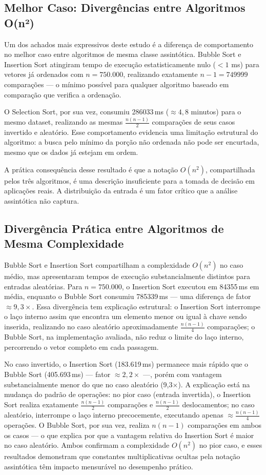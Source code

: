 \documentclass[12pt]{article}
\newcommand{\num}[1]{#1}
\begin{document}
\subsection{Melhor Caso: Divergências entre Algoritmos O(n²)}

Um dos achados mais expressivos deste estudo é a diferença de
comportamento no melhor caso entre algoritmos de mesma classe
assintótica. Bubble Sort e Insertion Sort atingiram tempo de
execução estatisticamente nulo ($< 1$ ms) para vetores já
ordenados com $n = 750.000$, realizando exatamente $n - 1 =
\num{749999}$ comparações — o mínimo possível para qualquer
algoritmo baseado em comparação que verifica a ordenação.

O Selection Sort, por sua vez, consumiu 286033\,ms
($\approx 4,8$ minutos) para o mesmo dataset, realizando as mesmas
$\frac{n(n-1)}{2}$ comparações de seus casos invertido e
aleatório. Esse comportamento evidencia uma limitação estrutural
do algoritmo: a busca pelo mínimo da porção não ordenada não
pode ser encurtada, mesmo que os dados já estejam em ordem.

A prática consequência desse resultado é que a notação $O(n^2)$,
compartilhada pelos três algoritmos, é uma descrição insuficiente
para a tomada de decisão em aplicações reais. A distribuição da
entrada é um fator crítico que a análise assintótica não captura.

\subsection{Divergência Prática entre Algoritmos de Mesma Complexidade}

Bubble Sort e Insertion Sort compartilham a complexidade
$O(n^2)$ no caso médio, mas apresentaram tempos de execução
substancialmente distintos para entradas aleatórias.
Para $n = 750.000$, o Insertion Sort executou em
84355\,ms em média, enquanto o Bubble Sort
consumiu 785339\,ms — uma diferença de fator
$\approx 9{,}3\times$. Essa divergência tem explicação estrutural:
o Insertion Sort interrompe o laço interno assim que encontra
um elemento menor ou igual à chave sendo inserida, realizando
no caso aleatório aproximadamente $\frac{n(n-1)}{4}$ comparações;
o Bubble Sort, na implementação avaliada, não reduz o limite
do laço interno, percorrendo o vetor completo em cada passagem.

No caso invertido, o Insertion Sort (183.619\,ms) permanece
mais rápido que o Bubble Sort (405.693\,ms) — fator
$\approx 2{,}2\times$ —, porém com vantagem substancialmente
menor do que no caso aleatório (9,3×). A explicação está na
mudança do padrão de operações: no pior caso (entrada
invertida), o Insertion Sort realiza exatamente
$\frac{n(n-1)}{2}$ comparações e $\frac{n(n-1)}{2}$
deslocamentos; no caso aleatório, interrompe o laço interno
precocemente, executando apenas $\approx\frac{n(n-1)}{4}$
operações. O Bubble Sort, por sua vez, realiza $n(n-1)$
comparações em ambos os casos — o que explica por que a
vantagem relativa do Insertion Sort é maior no caso
aleatório. Ambos confirmam a complexidade $O(n^2)$ no pior
caso, e esses resultados demonstram que constantes
multiplicativas ocultas pela notação assintótica têm impacto
mensurável no desempenho prático.
\end{document}
